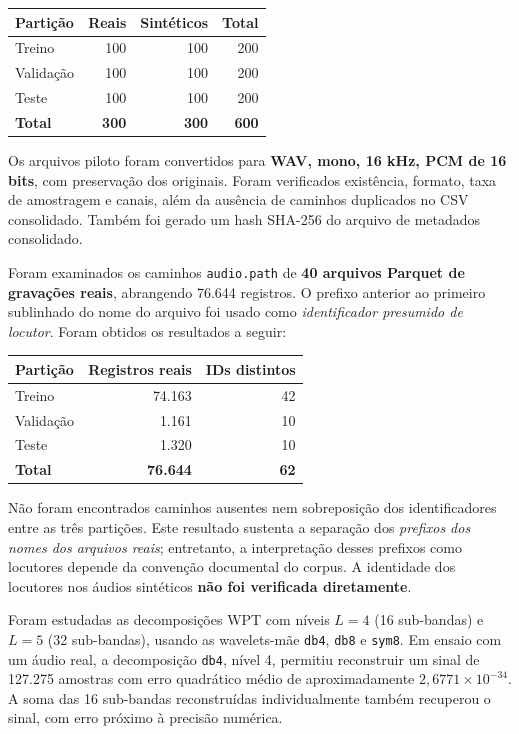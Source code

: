\documentclass[11pt,a4paper]{article}
\newcommand{\subtitulo}[1]{\vspace{4pt}{\large\bfseries #1}\par\vspace{2pt}}
\begin{document}
\begin{center}
\begin{tabular}{lrrr}\toprule
\textbf{Partição} & \textbf{Reais} & \textbf{Sintéticos} & \textbf{Total}\\\midrule
Treino & 100 & 100 & 200\\
Validação & 100 & 100 & 200\\
Teste & 100 & 100 & 200\\\midrule
\textbf{Total} & \textbf{300} & \textbf{300} & \textbf{600}\\\bottomrule
\end{tabular}
\end{center}
Os arquivos piloto foram convertidos para \textbf{WAV, mono, 16 kHz, PCM de 16 bits}, com preservação dos originais. Foram verificados existência, formato, taxa de amostragem e canais, além da ausência de caminhos duplicados no CSV consolidado. Também foi gerado um hash SHA-256 do arquivo de metadados consolidado.
\subtitulo{2.2 Verificação de identificadores nas partições oficiais}
Foram examinados os caminhos \texttt{audio.path} de \textbf{40 arquivos Parquet de gravações reais}, abrangendo 76.644 registros. O prefixo anterior ao primeiro sublinhado do nome do arquivo foi usado como \emph{identificador presumido de locutor}. Foram obtidos os resultados a seguir:

\begin{center}
\begin{tabular}{lrr}\toprule
\textbf{Partição} & \textbf{Registros reais} & \textbf{IDs distintos}\\\midrule
Treino & 74.163 & 42\\
Validação & 1.161 & 10\\
Teste & 1.320 & 10\\\midrule
\textbf{Total} & \textbf{76.644} & \textbf{62}\\\bottomrule
\end{tabular}
\end{center}
Não foram encontrados caminhos ausentes nem sobreposição dos identificadores entre as três partições. Este resultado sustenta a separação dos \emph{prefixos dos nomes dos arquivos reais}; entretanto, a interpretação desses prefixos como locutores depende da convenção documental do corpus. A identidade dos locutores nos áudios sintéticos \textbf{não foi verificada diretamente}.
\subtitulo{2.3 Estudo teórico e ensaios de WPT}
Foram estudadas as decomposições WPT com níveis $L=4$ (16 sub-bandas) e $L=5$ (32 sub-bandas), usando as wavelets-mãe \texttt{db4}, \texttt{db8} e \texttt{sym8}. Em ensaio com um áudio real, a decomposição \texttt{db4}, nível 4, permitiu reconstruir um sinal de 127.275 amostras com erro quadrático médio de aproximadamente $2{,}6771\times10^{-34}$. A soma das 16 sub-bandas reconstruídas individualmente também recuperou o sinal, com erro próximo à precisão numérica.
\end{document}
